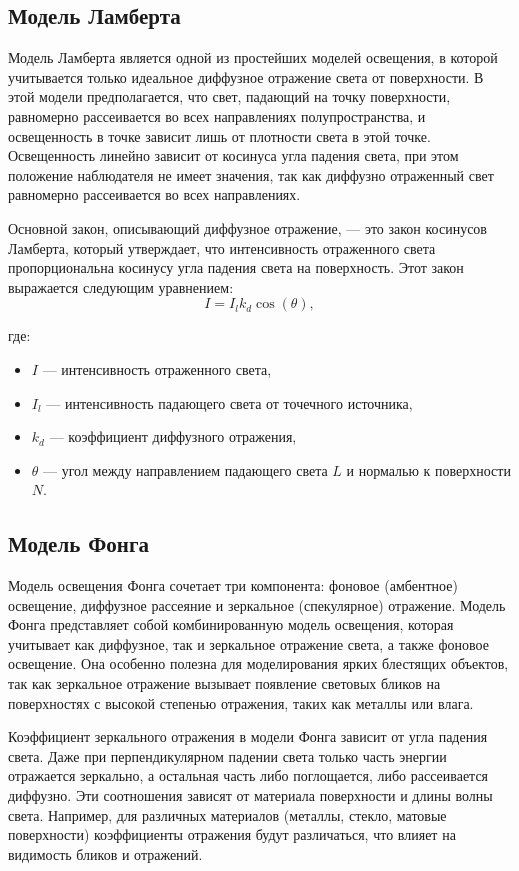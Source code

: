 \subsection{Модель Ламберта}
Модель Ламберта является одной из простейших моделей освещения, в которой учитывается только идеальное диффузное отражение света от поверхности. В этой модели предполагается, что свет, падающий на точку поверхности, равномерно рассеивается во всех направлениях полупространства, и освещенность в точке зависит лишь от плотности света в этой точке. Освещенность линейно зависит от косинуса угла падения света, при этом положение наблюдателя не имеет значения, так как диффузно отраженный свет равномерно рассеивается во всех направлениях.

Основной закон, описывающий диффузное отражение, — это закон косинусов Ламберта, который утверждает, что интенсивность отраженного света пропорциональна косинусу угла падения света на поверхность. Этот закон выражается следующим уравнением:
\begin{equation}
	I = I_l k_d \cos(\theta),
\end{equation}

где:  
\begin{itemize}
	\item $I$ — интенсивность отраженного света,  
	\item $I_l$ — интенсивность падающего света от точечного источника,  
	\item $k_d$ — коэффициент диффузного отражения,  
	\item $\theta$ — угол между направлением падающего света $L$ и нормалью к поверхности $N$.  
\end{itemize}

\subsection{Модель Фонга}

Модель освещения Фонга сочетает три компонента: фоновое (амбентное) освещение, диффузное рассеяние и зеркальное (спекулярное) отражение.
Модель Фонга представляет собой комбинированную модель освещения, которая учитывает как диффузное, так и зеркальное отражение света, а также фоновое освещение. Она особенно полезна для моделирования ярких блестящих объектов, так как зеркальное отражение вызывает появление световых бликов на поверхностях с высокой степенью отражения, таких как металлы или влага.

Коэффициент зеркального отражения в модели Фонга зависит от угла падения света. Даже при перпендикулярном падении света только часть энергии отражается зеркально, а остальная часть либо поглощается, либо рассеивается диффузно. Эти соотношения зависят от материала поверхности и длины волны света. Например, для различных материалов (металлы, стекло, матовые поверхности) коэффициенты отражения будут различаться, что влияет на видимость бликов и отражений.

